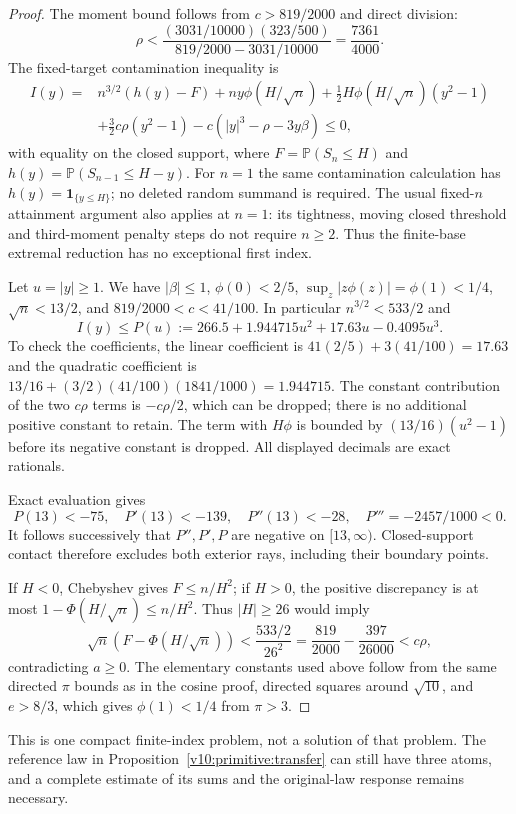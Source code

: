 \documentclass[11pt,a4paper]{article}
\newcommand{\Pp}{\mathbb P}
\begin{document}
\begin{proof}
The moment bound follows from $c>819/2000$ and direct division:
\[
 \rho<\frac{(3031/10000)(323/500)}{819/2000-3031/10000}
      =\frac{7361}{4000}.
\]
The fixed-target contamination inequality is
\begin{align*}
 I(y)={}&n^{3/2}(h(y)-F)+ny\phi(H/\sqrt n)
       +\tfrac12H\phi(H/\sqrt n)(y^2-1)\\
       &+\tfrac32c\rho(y^2-1)-c(|y|^3-\rho-3y\beta)\le0,
\end{align*}
with equality on the closed support, where
$F=\Pp(S_n\le H)$ and $h(y)=\Pp(S_{n-1}\le H-y)$.
For $n=1$ the same contamination calculation has
$h(y)=\mathbf1_{\{y\le H\}}$; no deleted random summand is required.
The usual fixed-$n$ attainment argument also applies at $n=1$: its tightness,
moving closed threshold and third-moment penalty steps do not require
$n\ge2$. Thus the finite-base extremal reduction has no exceptional first
index.

Let $u=|y|\ge1$. We have $|\beta|\le1$,
$\phi(0)<2/5$, $\sup_z|z\phi(z)|=\phi(1)<1/4$,
$\sqrt n<13/2$, and $819/2000<c<41/100$.
In particular $n^{3/2}<533/2$ and
\[
 I(y)\le P(u):=266.5+1.944715u^2+17.63u-0.4095u^3.
\]
To check the coefficients, the linear coefficient is
$41(2/5)+3(41/100)=17.63$ and the quadratic coefficient is
$13/16+(3/2)(41/100)(1841/1000)=1.944715$.
The constant contribution of the two $c\rho$ terms is $-c\rho/2$,
which can be dropped; there is no additional positive constant to retain.
The term with $H\phi$ is bounded by $(13/16)(u^2-1)$ before its
negative constant is dropped. All displayed decimals are exact rationals.

Exact evaluation gives
\[
 P(13)<-75,\quad P'(13)<-139,\quad P''(13)<-28,
 \quad P'''=-2457/1000<0.
\]
It follows successively that $P'',P',P$ are negative on $[13,\infty)$.
Closed-support contact therefore excludes both exterior rays, including
their boundary points.

If $H<0$, Chebyshev gives $F\le n/H^2$; if $H>0$, the positive
discrepancy is at most $1-\Phi(H/\sqrt n)\le n/H^2$.
Thus $|H|\ge26$ would imply
\[
 \sqrt n(F-\Phi(H/\sqrt n))<\frac{533/2}{26^2}
   =\frac{819}{2000}-\frac{397}{26000}<c\rho,
\]
contradicting $a\ge0$.
The elementary constants used above follow from the same directed
$\pi$ bounds as in the cosine proof, directed squares around $\sqrt{10}$,
and $e>8/3$, which gives $\phi(1)<1/4$ from $\pi>3$.
\end{proof}

This is one compact finite-index problem, not a solution of that problem.
The reference law in Proposition~\ref{v10:primitive:transfer} can still
have three atoms, and a complete estimate of its sums and the original-law
response remains necessary.
\end{document}
